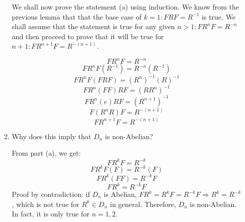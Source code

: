 \documentclass{article}
\begin{document}
\begin{enumerate}
\begin{enumerate}
\begin{flushleft}
We shall now prove the statement (a) using induction. We know from the previous lemma that that the base case of $k=1: FRF = R^{-1}$ is true. We shall assume that the statement is true for any given $n > 1: FR^nF = R^{-n}$ and then proceed to prove that it will be true for $n+1: FR^{n+1}F = R^{-(n+1)}$.
\end{flushleft}

$$FR^nF = R^{-n}$$
$$FR^nF(R^{-1}) = R^{-n}(R^{-1})$$
$$FR^nF(FRF) = (R^n)^{-1}(R)^{-1}$$
$$FR^n(FF)RF = (RR^n)^{-1}$$
$$FR^n(e)RF = (R^{n+1})^{-1}$$
$$F(R^nR)F = R^{-(n+1)}$$
$$FR^{n+1}F = R^{-(n+1)}$$

\newpage
\item Why does this imply that $D_n$ is non-Abelian?
\begin{flushleft}
From part (a), we get:
$$FR^kF =  R^{-k}$$
$$FR^kF(F) =  R^{-k}(F)$$
$$FR^k(FF) =  R^{-k}F$$
$$FR^k =  R^{-k}F$$
Proof by contradiction: if $D_n$ is Abelian, $FR^k = R^kF = R^{-k}F \Rightarrow R^k = R^{-k}$, which is not true for $R^k \in D_n$ in general. Therefore, $D_n$ is non-Abelian. In fact, it is only true for $n=1,2$.
\end{flushleft}
\end{enumerate}

\end{enumerate}
\end{document}
